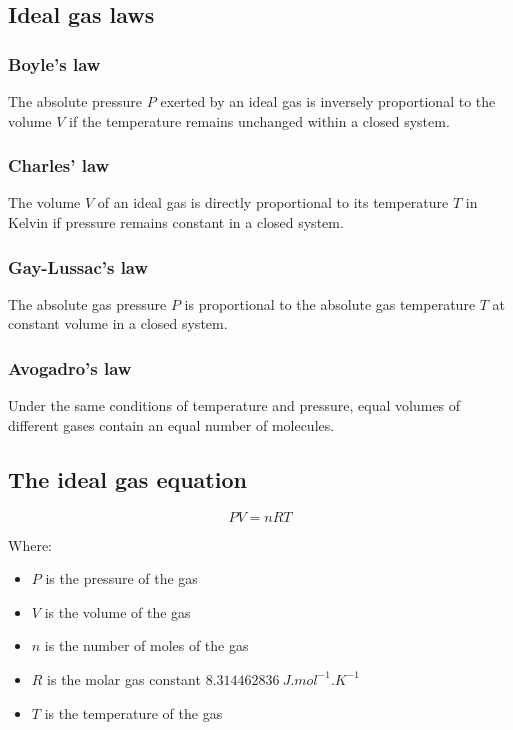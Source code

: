 \documentclass[11pt]{article}
\begin{document}
\subsection{Ideal gas laws}
\label{sec:orgac34fc7}

\subsubsection{Boyle's law}
\label{sec:orga96039e}
The absolute pressure \(P\) exerted by an ideal gas is inversely proportional to the volume \(V\) if the temperature remains unchanged within a closed system.

\subsubsection{Charles' law}
\label{sec:org91eafc9}
The volume \(V\) of an ideal gas is directly proportional to its temperature \(T\) in Kelvin if pressure remains constant in a closed system.

\subsubsection{Gay-Lussac's law}
\label{sec:orge0bb31b}
The absolute gas pressure \(P\) is proportional to the absolute gas temperature \(T\) at constant volume in a closed system.

\subsubsection{Avogadro's law}
\label{sec:orgb0fd732}
Under the same conditions of temperature and pressure, equal volumes of different gases contain an equal number of molecules.

\subsection{The ideal gas equation}
\label{sec:orgdc417f7}
\[PV = nRT\]

Where:
\begin{itemize}
\item \(P\) is the pressure of the gas
\item \(V\) is the volume of the gas
\item \(n\) is the number of moles of the gas
\item \(R\) is the molar gas constant \(\qty{8.314462836}{J.mol^{-1}.K^{-1}}\)
\item \(T\) is the temperature of the gas
\end{itemize}
\end{document}

